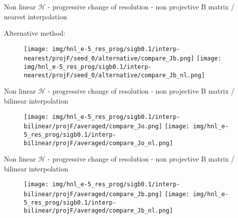 \documentclass[francais]{beamer}
\begin{document}
\begin{frame}{Non linear $\mathcal{H}$ - progressive change of resolution - non projective B matrix / nearest interpolation}
\begin{center}
Alternative method:
\begin{figure}
  \texttt{[image: img/hnl\_e-5\_res\_prog/sigb0.1/interp-nearest/projF/seed\_0/alternative/compare\_Jb.png]}
\endminipage\hfill
{}
  \texttt{[image: img/hnl\_e-5\_res\_prog/sigb0.1/interp-nearest/projF/seed\_0/alternative/compare\_Jb\_nl.png]}
\endminipage
\end{figure}
\end{center}
\end{frame}

\begin{frame}{Non linear $\mathcal{H}$ - progressive change of resolution - non projective B matrix / bilinear interpolation}
\begin{center}
\begin{figure}
  \texttt{[image: img/hnl\_e-5\_res\_prog/sigb0.1/interp-bilinear/projF/averaged/compare\_Jo.png]}
\endminipage\hfill
{}
  \texttt{[image: img/hnl\_e-5\_res\_prog/sigb0.1/interp-bilinear/projF/averaged/compare\_Jo\_nl.png]}
\endminipage
\end{figure}
\end{center}
\end{frame}

\begin{frame}{Non linear $\mathcal{H}$ - progressive change of resolution - non projective B matrix / bilinear interpolation}
\begin{center}
\begin{figure}
  \texttt{[image: img/hnl\_e-5\_res\_prog/sigb0.1/interp-bilinear/projF/averaged/compare\_Jb.png]}
\endminipage\hfill
{}
  \texttt{[image: img/hnl\_e-5\_res\_prog/sigb0.1/interp-bilinear/projF/averaged/compare\_Jb\_nl.png]}
\endminipage
\end{figure}
\end{center}
\end{frame}
\end{document}
